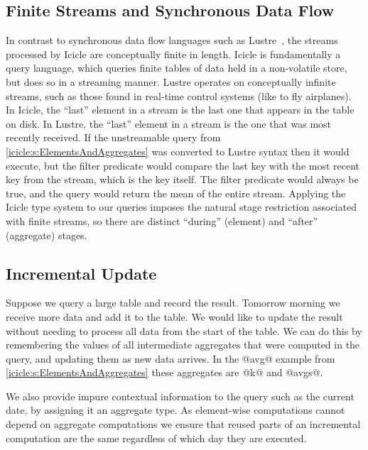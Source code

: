 \subsection{Finite Streams and Synchronous Data Flow}
In contrast to synchronous data flow languages such as {\sc Lustre}~\cite{halbwachs1991synchronous}, the streams processed by Icicle are conceptually finite in length.
Icicle is fundamentally a query language, which queries finite tables of data held in a non-volatile store, but does so in a streaming manner.
Lustre operates on conceptually infinite streams, such as those found in real-time control systems (like to fly airplanes).
In Icicle, the ``last'' element in a stream is the last one that appears in the table on disk.
In Lustre, the ``last'' element in a stream is the one that was most recently received.
If the unstreamable query from \autoref{icicle:s:ElementsAndAggregates} was converted to Lustre syntax then it would execute, but the filter predicate would compare the last key with the most recent key from the stream, which is the key itself.
The filter predicate would always be true, and the query would return the mean of the entire stream.
Applying the Icicle type system to our queries imposes the natural stage restriction associated with finite streams, so there are distinct ``during'' (element) and ``after'' (aggregate) stages.


\subsection{Incremental Update}
Suppose we query a large table and record the result. Tomorrow morning we receive more data and add it to the table. We would like to update the result without needing to process all data from the start of the table. We can do this by remembering the values of all intermediate aggregates that were computed in the query, and updating them as new data arrives. In the @avg@ example from \autoref{icicle:s:ElementsAndAggregates} these aggregates are @k@ and @avgs@. 

We also provide impure contextual information to the query such as the current date, by assigning it an aggregate type. As element-wise computations cannot depend on aggregate computations we ensure that reused parts of an incremental computation are the same regardless of which day they are executed.


